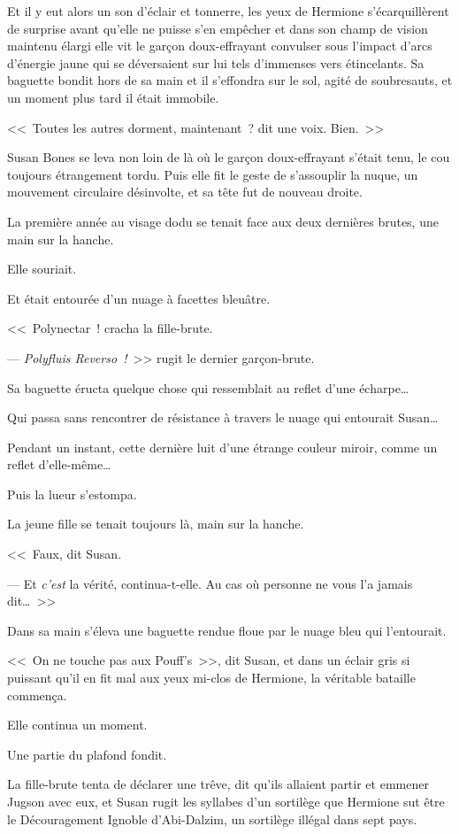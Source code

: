 Et il y eut alors un son d'éclair et tonnerre, les yeux de Hermione s'écarquillèrent de surprise avant qu'elle ne puisse s'en empêcher et dans son champ de vision maintenu élargi elle vit le garçon doux-effrayant convulser sous l'impact d'arcs d'énergie jaune qui se déversaient sur lui tels d'immenses vers étincelants. Sa baguette bondit hors de sa main et il s'effondra sur le sol, agité de soubresauts, et un moment plus tard il était immobile.

<<~Toutes les autres dorment, maintenant~? dit une voix. Bien.~>>

Susan Bones se leva non loin de là où le garçon doux-effrayant s'était tenu, le cou toujours étrangement tordu. Puis elle fit le geste de s'assouplir la nuque, un mouvement circulaire désinvolte, et sa tête fut de nouveau droite.

La première année au visage dodu se tenait face aux deux dernières brutes, une main sur la hanche.

Elle souriait.

Et était entourée d'un nuage à facettes bleuâtre.

<<~Polynectar~! cracha la fille-brute.

--- \emph{Polyfluis Reverso~!}~>> rugit le dernier garçon-brute.

Sa baguette éructa quelque chose qui ressemblait au reflet d'une écharpe…

Qui passa sans rencontrer de résistance à travers le nuage qui entourait Susan…

Pendant un instant, cette dernière luit d'une étrange couleur miroir, comme un reflet d'elle-même…

Puis la lueur s'estompa.

La jeune fille se tenait toujours là, main sur la hanche.

<<~Faux, dit Susan.

--- Et \emph{c'est} la vérité, continua-t-elle. Au cas où personne ne vous l'a jamais dit…~>>

Dans sa main s'éleva une baguette rendue floue par le nuage bleu qui l'entourait.

<<~On ne touche pas aux Pouff's~>>, dit Susan, et dans un éclair gris si puissant qu'il en fit mal aux yeux mi-clos de Hermione, la véritable bataille commença.

Elle continua un moment.

Une partie du plafond fondit.

La fille-brute tenta de déclarer une trêve, dit qu'ils allaient partir et emmener Jugson avec eux, et Susan rugit les syllabes d'un sortilège que Hermione sut être le Découragement Ignoble d'Abi-Dalzim, un sortilège illégal dans sept pays.

